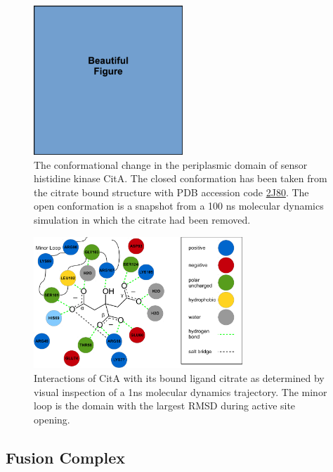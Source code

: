 \documentclass[english, a4paper, 12pt, titlepage, draft]{article}
\begin{document}
\begin{figure}
    \centering
    \includegraphics[width=0.5\textwidth]{figures/draft/draft.pdf}
    \caption{The conformational change in the periplasmic domain of sensor histidine kinase CitA.
    The closed conformation has been taken from the citrate bound structure with PDB accession code \href{http://pdb.rcsb.org/pdb/explore/explore.do?structureId=2J80}{2J80}.
The open conformation is a snapshot from a 100 ns molecular dynamics simulation in which the citrate had been removed.}
    \label{fig:CitA_opening}
\end{figure}     



\begin{figure}
    \centering
    \includegraphics[width=0.7\textwidth]{figures/citrate_interactions/citrate_interactions.pdf}
    \caption{Interactions of CitA with its bound ligand citrate as determined by visual inspection of a 1ns molecular dynamics trajectory. The minor loop is the domain with the largest RMSD during active site opening.}
    \label{fig:citrate_interactions}
\end{figure}      



\subsection{Fusion Complex}
\end{document}
